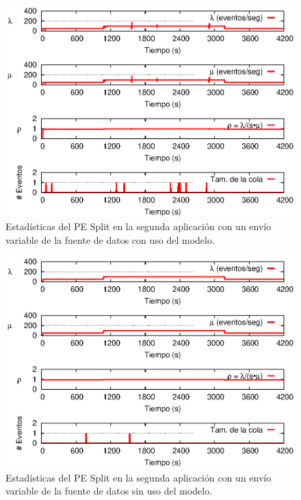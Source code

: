 \begin{figure}[!ht]
\centering
    \includegraphics[scale=1.1]{images/exp/app2/normal/cm/statusSplitPE.eps}
    \caption{Estad\'isticas del PE Split en la segunda aplicaci\'on con un env\'io variable de la fuente de datos con uso del modelo.}
    \label{fig:app2-normal-statusSplitPE-cm}
\end{figure}

\begin{figure}[!ht]
\centering
    \includegraphics[scale=1.1]{images/exp/app2/normal/sm/statusSplitPE.eps}
    \caption{Estad\'isticas del PE Split en la segunda aplicaci\'on con un env\'io variable de la fuente de datos sin uso del modelo.}
    \label{fig:app2-normal-statusSplitPE-sm}
\end{figure}

